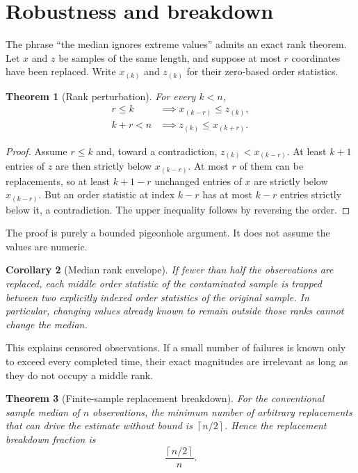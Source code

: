 \documentclass[11pt]{article}
\newtheorem{theorem}{Theorem}[section]
\newtheorem{corollary}[theorem]{Corollary}
\newcommand{\ceil}[1]{\left\lceil#1\right\rceil}
\begin{document}
\section{Robustness and breakdown}

The phrase ``the median ignores extreme values'' admits an exact rank theorem.
Let $x$ and $z$ be samples of the same length, and suppose at most $r$
coordinates have been replaced.  Write $x_{(k)}$ and $z_{(k)}$ for their
zero-based order statistics.

\begin{theorem}[Rank perturbation]\label{thm:rank-perturbation}
For every $k<n$,
\begin{align*}
 r\leq k &\implies x_{(k-r)}\leq z_{(k)},\\
 k+r<n &\implies z_{(k)}\leq x_{(k+r)}.
\end{align*}
\end{theorem}

\begin{proof}
Assume $r\leq k$ and, toward a contradiction,
$z_{(k)}<x_{(k-r)}$.  At least $k+1$ entries of $z$ are then strictly below
$x_{(k-r)}$.  At most $r$ of them can be replacements, so at least
$k+1-r$ unchanged entries of $x$ are strictly below $x_{(k-r)}$.  But an order
statistic at index $k-r$ has at most $k-r$ entries strictly below it, a
contradiction.  The upper inequality follows by reversing the order.
\end{proof}

The proof is purely a bounded pigeonhole argument.  It does not assume the
values are numeric.

\begin{corollary}[Median rank envelope]
If fewer than half the observations are replaced, each middle order statistic
of the contaminated sample is trapped between two explicitly indexed order
statistics of the original sample.  In particular, changing values already
known to remain outside those ranks cannot change the median.
\end{corollary}

This explains censored observations.  If a small number of failures is known
only to exceed every completed time, their exact magnitudes are irrelevant as
long as they do not occupy a middle rank.

\begin{theorem}[Finite-sample replacement breakdown]\label{thm:breakdown}
For the conventional sample median of $n$ observations, the minimum number of
arbitrary replacements that can drive the estimate without bound is
$\ceil{n/2}$.  Hence the replacement breakdown fraction is
\[
  \frac{\ceil{n/2}}{n}.
\]
\end{theorem}
\end{document}
